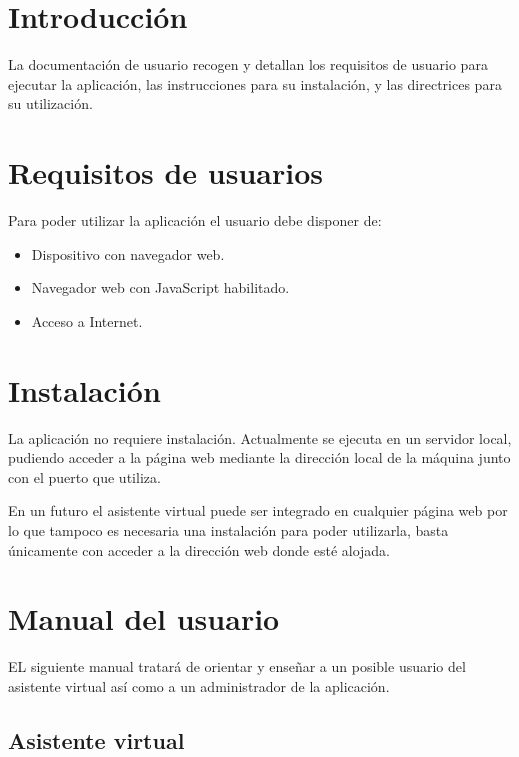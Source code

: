 
\section{Introducción}

La documentación de usuario recogen y detallan los requisitos de usuario para ejecutar la aplicación, las instrucciones para su instalación, y las directrices para su utilización.

\section{Requisitos de usuarios}

Para poder utilizar la aplicación el usuario debe disponer de:

\begin{itemize}
\tightlist
\item Dispositivo con navegador web.
\item Navegador web con JavaScript habilitado.
\item Acceso a Internet.
\end{itemize}

\section{Instalación}

La aplicación no requiere instalación. Actualmente se ejecuta en un servidor local, pudiendo acceder a la página web mediante la dirección local de la máquina junto con el puerto que utiliza.

En un futuro el asistente virtual puede ser integrado en cualquier página web por lo que tampoco es necesaria una instalación para poder utilizarla, basta únicamente con acceder a la dirección web donde esté alojada.


\section{Manual del usuario}

EL siguiente manual tratará de orientar y enseñar a un posible usuario del asistente virtual así como a un administrador de la aplicación.

\subsection{Asistente virtual}

